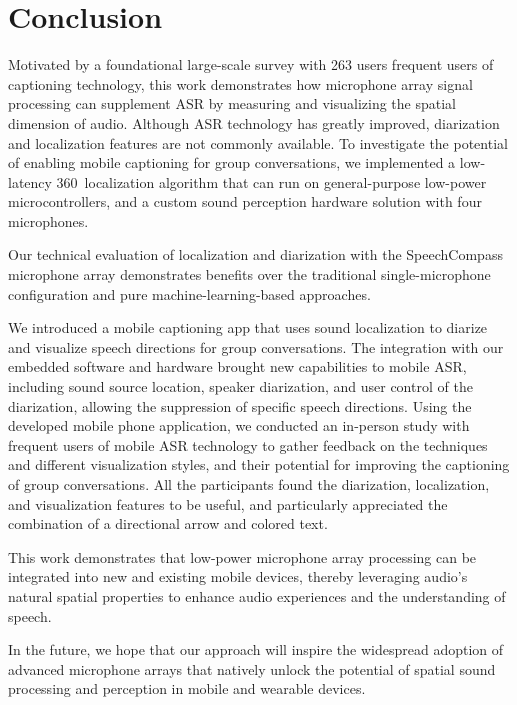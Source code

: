\section{Conclusion}
Motivated by a foundational large-scale survey with 263 users frequent users of captioning technology, this work demonstrates how microphone array signal processing can supplement ASR by measuring and visualizing the spatial dimension of audio. Although ASR technology has greatly improved, diarization and localization features are not commonly available. 
To investigate the potential of enabling mobile captioning for group conversations, we implemented a low-latency 360\textdegree~localization algorithm that can run on general-purpose low-power microcontrollers, and a custom sound perception hardware solution with four microphones. 

Our technical evaluation of localization and diarization with the SpeechCompass microphone array demonstrates benefits over the traditional single-microphone configuration and pure machine-learning-based approaches. 

We introduced a mobile captioning app that uses sound localization to diarize and visualize speech directions for group conversations. 
The integration with our embedded software and hardware brought new capabilities to mobile ASR, including sound source location, speaker diarization, and user control of the diarization, allowing the suppression of specific speech directions. 
Using the developed mobile phone application, we conducted an in-person study with frequent users of mobile ASR technology to gather feedback on the techniques and different visualization styles, and their potential for improving the captioning of group conversations. All the participants found the diarization, localization, and visualization features to be useful, and particularly appreciated the combination of a directional arrow and colored text. 

This work demonstrates that low-power microphone array processing can be integrated into new and existing mobile devices, thereby leveraging audio's natural spatial properties to enhance audio experiences and the understanding of speech. 

In the future, we hope that our approach will inspire the widespread adoption of advanced microphone arrays that natively unlock the potential of spatial sound processing and perception in mobile and wearable devices.